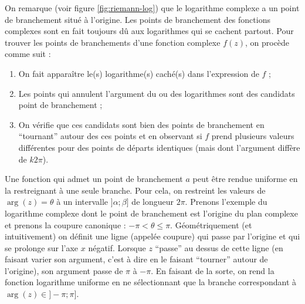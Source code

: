 \begin{myrem}
	On remarque (voir figure \ref{fig:riemann-log})
	que le logarithme complexe a un point de branchement situé
	à l'origine. Les points de branchement des fonctions complexes
	sont en fait toujours dû aux logarithmes qui se cachent partout.
	Pour trouver les points de branchements d'une fonction complexe
	$f(z)$, on procède comme suit :
	\begin{enumerate}
		\item On fait apparaître le(s) logarithme(s) caché(s) dans
		l'expression de $f$ ;
		\item	Les points qui annulent l'argument du ou des logarithmes
		sont des candidats point de branchement ;
		\item On vérifie que ces candidats sont bien des points
		de branchement en ``tournant'' autour des ces points
		et en observant si $f$ prend plusieurs valeurs différentes
		pour des points de départs identiques (mais dont l'argument
		diffère de $k2\pi$).
	\end{enumerate}
\end{myrem}

\begin{mydef}[Coupure]
	Une fonction qui admet un point de branchement $a$ peut
	être rendue uniforme en la restreignant à une seule branche.
	Pour cela, on restreint les valeurs de $\arg(z) = \theta$ à un intervalle
	$]\alpha;\beta]$ de longueur $2\pi$. Prenons l'exemple du logarithme
	complexe dont le point de branchement est l'origine du plan complexe et prenons
	la coupure canonique : $-\pi < \theta \leq \pi$. Géométriquement (et intuitivement) on
	définit une ligne (appelée coupure) qui passe par l'origine et qui se
	prolonge sur l'axe $x$ négatif. Lorsque $z$ ``passe'' au
	dessus de cette ligne (en faisant varier son argument, c'est à
	dire en le faisant ``tourner'' autour de l'origine), son
	argument passe de $\pi$ à $-\pi$. En faisant de la sorte,
	on rend la fonction logarithme uniforme en ne sélectionnant
	que la branche correspondant à $\arg(z) \in ]-\pi;\pi].$
\end{mydef}

